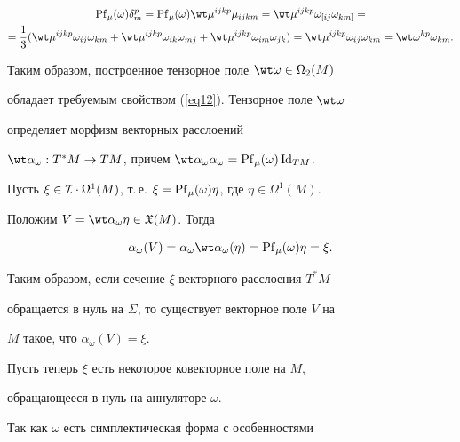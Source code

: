 \begin{pf}
\begin{multline*}


\Pf_\mu(\omega)\delta^p_m = \Pf_\mu(\omega) \wt\mu{}^{ijkp} \mu_{ijkm} =


\wt\mu{}^{ijkp} \omega_{[ij}\omega_{km]} =


\\


=\frac{1}{3}(\wt\mu{}^{ijkp}\omega_{ij}\omega_{km} +


\wt\mu{}^{ijkp}\omega_{ik}\omega_{mj} +


\wt\mu{}^{ijkp}\omega_{im}\omega_{jk}) =


\wt\mu{}^{ijkp}\omega_{ij}\omega_{km} = \wt\omega{}^{kp}\omega_{km}.


\end{multline*}


Таким образом, построенное тензорное поле $\wt\omega \in \Omega_2(M)$


обладает требуемым свойством (\ref{eq12}). Тензорное поле $\wt\omega$


определяет морфизм векторных расслоений


$\wt\alpha_\omega : T^*M \to TM$, причем $\wt\alpha_\omega \alpha_\omega =


\Pf_\mu(\omega) \Id_{TM}$.





Пусть $\xi \in \cI\cdot\Omega^1(M)$, т.\,е. $\xi =


\Pf_\mu(\omega)\eta$, где $\eta \in \Omega^1(M)$.


Положим $V = \wt\alpha_\omega \eta \in \gX(M)$. Тогда


$$


\alpha_\omega(V) = \alpha_\omega \wt\alpha_\omega(\eta) =


\Pf_\mu(\omega)\eta = \xi.


$$


Таким образом, если сечение $\xi$ векторного расслоения $T^*M$


обращается в нуль на $\Sigma$, то существует векторное поле $V$ на


$M$ такое, что $\alpha_\omega(V) = \xi$.








Пусть теперь $\xi$ есть некоторое ковекторное поле на $M$,


обращающееся в нуль на аннуляторе $\omega$.


Так как $\omega$ есть симплектическая форма с особенностями



\end{pf}
